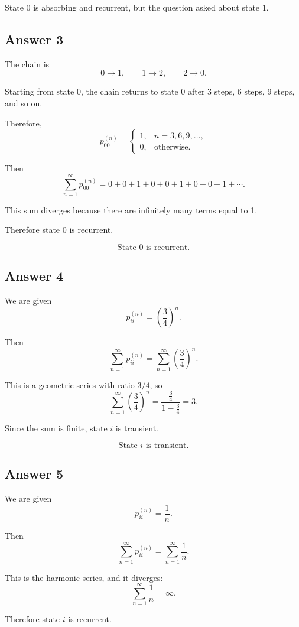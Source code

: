 \documentclass[12pt,a4paper]{article}
\theoremstyle{notestyle}
\begin{document}
State $0$ is absorbing and recurrent, but the question asked about state $1$.

\subsection*{Answer 3}

The chain is
\[
0\to 1,\qquad 1\to 2,\qquad 2\to 0.
\]

Starting from state $0$, the chain returns to state $0$ after 3 steps, 6 steps, 9 steps, and so on.

Therefore,
\[
p_{00}^{(n)}
=
\begin{cases}
1, & n=3,6,9,\ldots,\\
0, & \text{otherwise}.
\end{cases}
\]

Then
\[
\sum_{n=1}^{\infty}p_{00}^{(n)}
=
0+0+1+0+0+1+0+0+1+\cdots.
\]

This sum diverges because there are infinitely many terms equal to 1.

Therefore state $0$ is recurrent.

\[
\boxed{\text{State }0\text{ is recurrent.}}
\]

\subsection*{Answer 4}

We are given
\[
p_{ii}^{(n)}=\left(\frac34\right)^n.
\]

Then
\[
\sum_{n=1}^{\infty}p_{ii}^{(n)}
=
\sum_{n=1}^{\infty}\left(\frac34\right)^n.
\]

This is a geometric series with ratio $3/4$, so
\[
\sum_{n=1}^{\infty}\left(\frac34\right)^n
=
\frac{\frac34}{1-\frac34}
=3.
\]

Since the sum is finite, state $i$ is transient.

\[
\boxed{\text{State }i\text{ is transient.}}
\]

\subsection*{Answer 5}

We are given
\[
p_{ii}^{(n)}=\frac1n.
\]

Then
\[
\sum_{n=1}^{\infty}p_{ii}^{(n)}
=
\sum_{n=1}^{\infty}\frac1n.
\]

This is the harmonic series, and it diverges:
\[
\sum_{n=1}^{\infty}\frac1n=\infty.
\]

Therefore state $i$ is recurrent.
\end{document}
